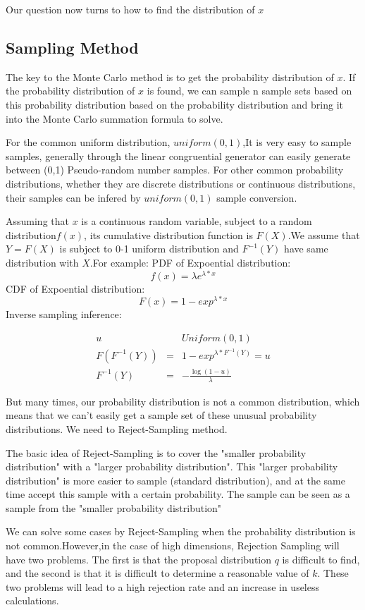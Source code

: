 Our question now turns to how to find the distribution of $x$
\subsection{Sampling Method}
The key to the Monte Carlo method is to get the probability distribution of $x$. If the probability distribution of $x$ is found, we can sample n sample sets based on this probability distribution based on the probability distribution and bring it into the Monte Carlo summation formula to solve.

For the common uniform distribution, $uniform (0,1)$,It  is very easy to sample samples, generally through the linear congruential generator can easily generate between (0,1) Pseudo-random number samples. For other common probability distributions, whether they are discrete distributions or continuous distributions, their samples can be infered by $uniform (0,1)$ sample conversion.

Assuming that $x$ is a continuous random variable, subject to a random distribution$f(x)$, its cumulative distribution function is $F(X)$.We assume that $Y = F(X)$ is subject to 0-1 uniform distribution and $F^{-1}(Y)$ have same distribution with $X$.For example:
PDF of Expoential distribution:
\[
  f(x) = \lambda e^{\lambda*x}
\]
CDF of Expoential distribution:
\[
  F(x) = 1- exp^{\lambda*x}
\]
Inverse sampling inference:

\begin{eqnarray*}
u &~& Uniform(0,1) \\
F(F^{-1}(Y)) &=& 1- exp^{\lambda*F^{-1}(Y)} = u \\
F^{-1}(Y) &=&-\frac{\log(1-u)}{\lambda}
\end{eqnarray*}

But many times, our probability distribution is not a common distribution, which means that we can't easily get a sample set of these unusual probability distributions. We need to Reject-Sampling method.

The basic idea of Reject-Sampling is to cover the "smaller probability distribution" with a "larger probability distribution". This "larger probability distribution" is more easier to sample (standard distribution), and at the same time accept this  sample with a certain probability. The sample can be seen as a sample from the "smaller probability distribution"


We can solve some cases  by Reject-Sampling when the probability distribution is not common.However,in the case of high dimensions, Rejection Sampling will have two problems. The first is that the proposal  distribution $q$ is difficult to find, and the second is that it is difficult to determine a reasonable value of $k$. These two problems will lead to a high rejection rate and an increase in useless calculations.



